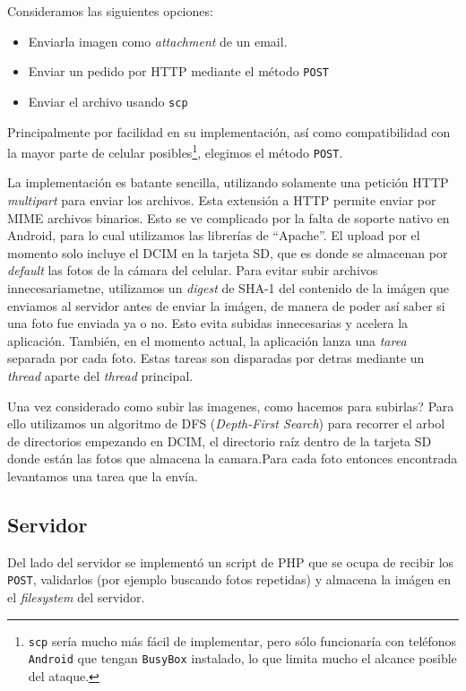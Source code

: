 Consideramos las siguientes opciones:
\begin{itemize}
	\item Enviarla imagen como \textit{attachment} de un email.
	\item Enviar un pedido por HTTP mediante el método \texttt{POST}
	\item Enviar el archivo usando \texttt{scp}
\end{itemize}

Principalmente por facilidad en su implementación, así como compatibilidad con la mayor parte de celular posibles\footnote{\texttt{scp} sería mucho más fácil de implementar, pero sólo funcionaría con teléfonos \texttt{Android} que tengan \texttt{BusyBox} instalado, lo que limita mucho el alcance posible del ataque.}, elegimos el método \texttt{POST}.

La implementación es batante sencilla, utilizando solamente una petición HTTP \textit{multipart} para enviar los archivos. Esta extensión a HTTP permite enviar por MIME archivos binarios. Esto se ve complicado por la falta de soporte nativo en Android, para lo cual utilizamos las librerías de ``Apache''. El upload por el momento solo incluye el DCIM en la tarjeta SD, que es donde se almacenan por \textit{default} las fotos de la cámara del celular. Para evitar subir archivos innecesariametne, utilizamos un \textit{digest} de SHA-1 del contenido de la imágen que enviamos al servidor antes de enviar la imágen, de manera de poder así saber si una foto fue enviada ya o no. Esto evita subidas innecesarias y acelera la aplicación. También, en el momento actual, la aplicación lanza una \textit{tarea} separada por cada foto. Estas tareas son disparadas por detras mediante un \textit{thread} aparte del \textit{thread} principal.

Una vez considerado como subir las imagenes, como hacemos para subirlas? Para ello utilizamos un algoritmo de
DFS (\textit{Depth-First Search}) para recorrer el arbol de directorios empezando en DCIM, el directorio raíz
dentro de la tarjeta SD donde están las fotos que almacena la camara.Para cada foto entonces encontrada levantamos una tarea que la envía.

\subsection{Servidor} %
\label{sub:Servidor}
Del lado del servidor se implementó un script de PHP que se ocupa de recibir los \texttt{POST}, validarlos (por ejemplo buscando fotos repetidas) y almacena la imágen en el \textit{filesystem} del servidor.

